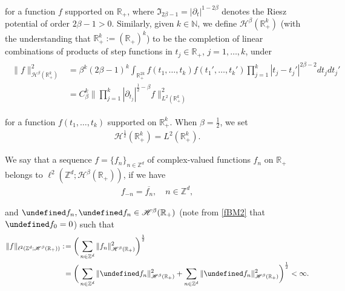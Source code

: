 \documentclass[letterpaper, 11pt,  reqno]{amsart}
\newcommand{\1}{\hspace{0.5mm}\textup{I}\hspace{0.5mm}}
\newcommand{\noi}{\noindent}
\newcommand{\Z}{\mathbb{Z}}
\newcommand{\R}{\mathbb{R}}
\let\Re=\undefined\DeclareMathOperator*{\Re}{Re}
\let\Im=\undefined\DeclareMathOperator*{\Im}{Im}
\newcommand{\be}{\beta}
\newcommand{\cj}{\overline}
\newcommand{\dt}{\partial_t}
\newcommand{\dd}{\partial}
\renewcommand{\l}{\ell}
\newcommand{\N}{\mathbb{N}}
\newcommand{\Hs}{\mathscr{H}}
\numberwithin{equation}{section}
\numberwithin{theorem}{section}
\begin{document}
\noi
for a function $f$ supported on $\R_+$, 
where
$\mathfrak{I}_{2\be-1} = |\dt|^{1-2\be}$ denotes the Riesz potential of order $2\be - 1>0$.
Similarly, given $k \in \N$, 
we 
define $\Hs^\be(\R_+^k)$ 
(with the understanding 
that $\R_+^k := (\R_+)^k$)
to be
the completion of 
linear combinations of
products of step functions in  $t_j \in \R_+$, $j = 1, \dots, k$,  under 
\begin{align}
\begin{split}
\|f\|_{\Hs^\be(\R_+^k)}^2
&   = \be^k(2\be-1)^k
\int_{\R_+^{2k}}
f(t_1, \dots, t_k) 
f(t_1', \dots, t_k')
\prod_{j = 1}^k |t_j-t_j'|^{2\be-2} dt_jdt_j' \\
&
= C_\be^k
\bigg\| \prod_{j = 1}^k |\dd_{t_j}|^{\frac 12 - \be}f\bigg\|_{L^2(\R^k_+)}^2
\end{split}
\label{BM0a}
\end{align}

\noi
for a function $f(t_1, \dots, t_k)$ supported on $\R_+^k$. 
When  $\be = \frac12$, we set  
\begin{align}
\Hs^\frac12(\R^k_+) = L^2(\R_+^k).
\label{BM1}
\end{align}













%
%
%
%

We say that 
a sequence $f = \{ f_n \}_{n \in \Z^d}$ of complex-valued functions
$f_n$ on $\R_+$
 belongs to $ \l^2(\Z^d;\Hs^\be(\R_+))$, 
if we have
 \begin{align}
 f_{-n} = \cj{f_n}, \quad n \in \Z^d, 
\label{fBM2} 
 \end{align}

\noi
and 
$\Re f_n, \Im f_n \in \Hs^\be(\R_+)$
(note from \eqref{fBM2}  that $\Im f_0 = 0$)
such that 
\begin{align*}
\|f\|_{\l^2(\Z^d;\Hs^\be(\R_+))}
:\! & = \bigg(\sum_{n \in \Z^d} \| f_n\|_{\Hs^\be(\R_+)}^2\bigg)^\frac 12\\
& = \bigg(\sum_{n \in \Z^d} \|\Re  f_n\|_{\Hs^\be(\R_+)}^2
+ \sum_{n \in \Z^d} \|\Im  f_n\|_{\Hs^\be(\R_+)}^2\bigg)^\frac 12 < \infty.
\end{align*}
 

 
\end{document}
